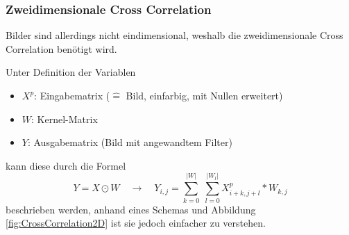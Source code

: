 \documentclass[12pt,a4]{article}
\begin{document}
\subsubsection{Zweidimensionale Cross Correlation}
Bilder sind allerdings nicht eindimensional, weshalb die zweidimensionale Cross Correlation benötigt wird. 

Unter Definition der Variablen
\begin{itemize}
\item $X^p$: Eingabematrix ($\hat{=}$ Bild, einfarbig, mit Nullen erweitert)
\item $W$: Kernel-Matrix
\item $Y$: Ausgabematrix (Bild mit angewandtem Filter)
\end{itemize}
kann diese durch die Formel
\begin{equation}
Y = X \odot W \quad \rightarrow \quad Y_{i, j} = \sum\limits_{k=0}^{|W|} \; \sum\limits_{l=0}^{|W_l|} X^p_{i+k, j+l} * W_{k, j}
\end{equation}
beschrieben werden, anhand eines Schemas und Abbildung \ref{fig:CrossCorrelation2D} ist sie jedoch einfacher zu verstehen.
\end{document}
